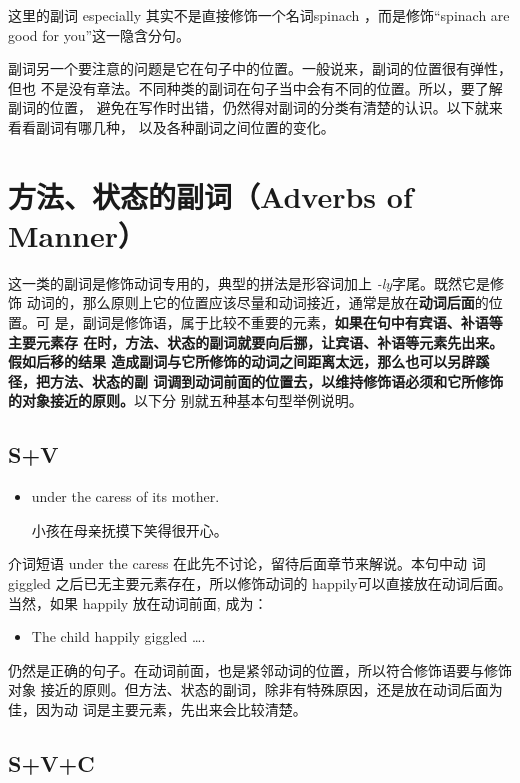 这里的副词 especially 其实不是直接修饰一个名词spinach ，而是修饰``spinach
are good for you''这一隐含分句。

副词另一个要注意的问题是它在句子中的位置。一般说来，副词的位置很有弹性，但也
不是没有章法。不同种类的副词在句子当中会有不同的位置。所以，要了解副词的位置，
避免在写作时出错，仍然得对副词的分类有清楚的认识。以下就来看看副词有哪几种，
以及各种副词之间位置的变化。

\section{方法、状态的副词（Adverbs of Manner）}

这一类的副词是修饰动词专用的，典型的拼法是形容词加上 \emph{-ly}字尾。既然它是修饰
动词的，那么原则上它的位置应该尽量和动词接近，通常是放在\textbf{动词后面}的位置。可
是，副词是修饰语，属于比较不重要的元素，\textbf{如果在句中有宾语、补语等主要元素存
  在时，方法、状态的副词就要向后挪，让宾语、补语等元素先出来。假如后移的结果
  造成副词与它所修饰的动词之间距离太远，那么也可以另辟蹊径，把方法、状态的副
  词调到动词前面的位置去，以维持修饰语必须和它所修饰的对象接近的原则。}以下分
别就五种基本句型举例说明。

\subsection{S+V}

\begin{itemize}
\item  {}   under the caress of its mother.

  小孩在母亲抚摸下笑得很开心。
\end{itemize}

介词短语 under the caress 在此先不讨论，留待后面章节来解说。本句中动
词giggled 之后已无主要元素存在，所以修饰动词的 happily可以直接放在动词后面。
当然，如果 happily 放在动词前面, 成为：
\begin{itemize}
\item  The child happily giggled \ldots.
\end{itemize}
仍然是正确的句子。在动词前面，也是紧邻动词的位置，所以符合修饰语要与修饰对象
接近的原则。但方法、状态的副词，除非有特殊原因，还是放在动词后面为佳，因为动
词是主要元素，先出来会比较清楚。

\subsection{S+V+C}

